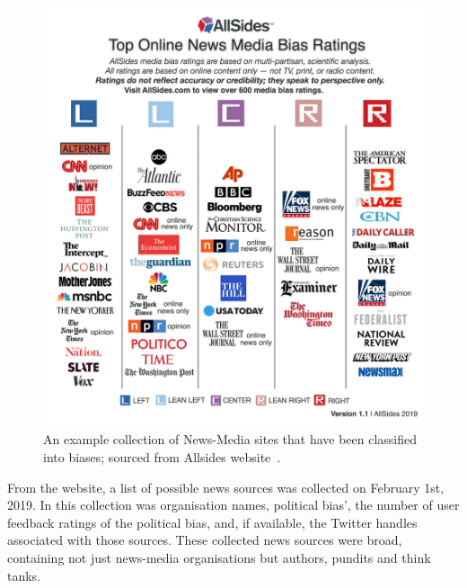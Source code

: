 \begin{figure}[!htbp]
	\centering
	\includegraphics[width=\linewidth]{chapter1/figs/AllSidesMediaBiasChart}
	\caption{An example collection of News-Media sites that have been classified into biases; sourced from Allsides website~\cite{gable_media_2019}.}
	\label{fig:allsidesmediabiaschart}
\end{figure}



From the website, a list of possible news sources was collected on February 1st, 2019. In this collection was organisation names, political bias', the number of user feedback ratings of the political bias, and, if available, the Twitter handles associated with those sources. These collected news sources were broad, containing not just news-media organisations but authors, pundits and think tanks. 


